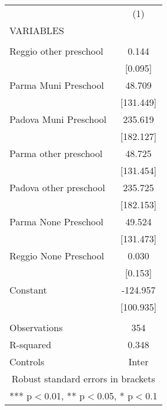 \begin{tabular}{lc} \hline
 & (1) \\
VARIABLES &  \\ \hline
 &  \\
Reggio other preschool & 0.144 \\
 & [0.095] \\
Parma Muni Preschool & 48.709 \\
 & [131.449] \\
Padova Muni Preschool & 235.619 \\
 & [182.127] \\
Parma other preschool & 48.725 \\
 & [131.454] \\
Padova other preschool & 235.725 \\
 & [182.153] \\
Parma None Preschool & 49.524 \\
 & [131.473] \\
Reggio None Preschool & 0.030 \\
 & [0.153] \\
Constant & -124.957 \\
 & [100.935] \\
 &  \\
Observations & 354 \\
R-squared & 0.348 \\
 Controls & Inter \\ \hline
\multicolumn{2}{c}{ Robust standard errors in brackets} \\
\multicolumn{2}{c}{ *** p$<$0.01, ** p$<$0.05, * p$<$0.1} \\
\end{tabular}
